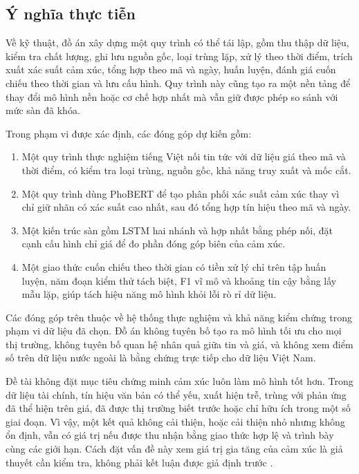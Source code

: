 \subsection{Ý nghĩa thực tiễn}

Về kỹ thuật, đồ án xây dựng một quy trình có thể tái lập, gồm thu thập dữ liệu, kiểm tra
chất lượng, ghi lưu nguồn gốc, loại trùng lặp, xử lý theo thời điểm, trích xuất xác suất cảm
xúc, tổng hợp theo mã và ngày, huấn luyện, đánh giá cuốn chiếu theo thời gian và lưu cấu hình. Quy
trình này cũng tạo ra một nền tảng để thay đổi mô hình nền hoặc cơ chế hợp nhất mà vẫn giữ
được phép so sánh với mức sàn đã khóa.

Trong phạm vi được xác định, các đóng góp dự kiến gồm:

\begin{enumerate}[nosep]
  \item Một quy trình thực nghiệm tiếng Việt nối tin tức với dữ liệu giá theo mã và
    thời điểm, có kiểm tra loại trùng, nguồn gốc, khả năng truy xuất và mốc cắt.
  \item Một quy trình dùng PhoBERT để tạo phân phối xác suất cảm xúc thay vì chỉ giữ
    nhãn có xác suất cao nhất, sau đó tổng hợp tín hiệu theo mã và ngày.
  \item Một kiến trúc sàn gồm LSTM hai nhánh và hợp nhất bằng phép nối, đặt cạnh cấu hình
    chỉ giá để đo phần đóng góp biên của cảm xúc.
  \item Một giao thức cuốn chiếu theo thời gian có tiền xử lý chỉ trên tập huấn luyện, năm
    đoạn kiểm thử tách biệt, F1 vĩ mô và khoảng tin cậy bằng lấy mẫu lặp, giúp tách hiệu
    năng mô hình khỏi lỗi rò rỉ dữ liệu.
\end{enumerate}

Các đóng góp trên thuộc về hệ thống thực nghiệm và khả năng kiểm chứng trong phạm vi
dữ liệu đã chọn. Đồ án không tuyên bố tạo ra mô hình tối ưu cho mọi thị trường, không
tuyên bố quan hệ nhân quả giữa tin và giá, và không xem điểm số trên dữ liệu nước ngoài
là bằng chứng trực tiếp cho dữ liệu Việt Nam.


Đề tài không đặt mục tiêu chứng minh cảm xúc luôn làm mô hình tốt hơn. Trong dữ liệu
tài chính, tín hiệu văn bản có thể yếu, xuất hiện trễ, trùng với phản ứng đã thể hiện
trên giá, đã được thị trường biết trước hoặc chỉ hữu ích trong một số giai đoạn. Vì vậy,
một kết quả không cải thiện, hoặc cải thiện nhỏ nhưng không ổn định, vẫn có giá trị nếu
được thu nhận bằng giao thức hợp lệ và trình bày cùng các giới hạn. Cách đặt vấn đề này
xem giá trị gia tăng của cảm xúc là giả thuyết cần kiểm tra, không phải kết luận được
giả định trước \cite{Jiang2023_230602136v3,Siala2026_260200086v3}.
